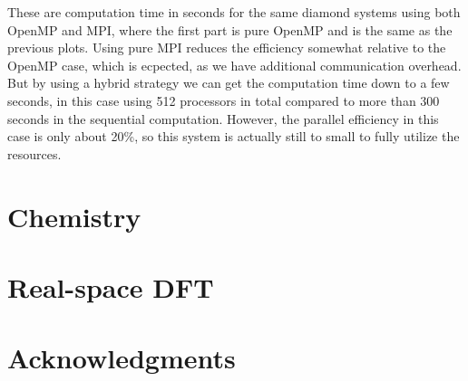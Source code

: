 \documentclass [a4paper]{report}
\begin{document}
These are computation time in seconds for the same diamond systems using both OpenMP and MPI, 
where the first part is pure OpenMP and is the same as the previous plots. Using pure MPI
reduces the efficiency somewhat relative to the OpenMP case, which is ecpected, as we have 
additional communication overhead. But by using a hybrid strategy we can get the computation
time down to a few seconds, in this case using 512 processors in total compared to more than 
300 seconds in the sequential computation. However, the parallel efficiency in this case is
only about 20\%, so this system is actually still to small to fully utilize the resources.


\section*{Chemistry}
\section*{Real-space DFT}
\section*{Acknowledgments}
\end{document}
